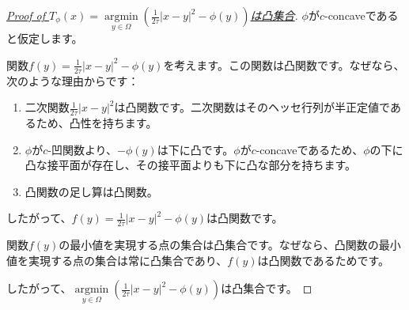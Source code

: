 \documentclass{jsarticle}
\theoremstyle{definition}
\begin{document}
\begin{proof}[\hyperlink{convex set of T}{Proof of \hypertarget{convex set}{$T_\phi(x) = \underset{y \in \Omega} {\operatorname{argmin}}\left( \frac{1}{2 \tau} |x - y|^2 - \phi(y) \right)$は凸集合}}]
    \quad\par
    $\phi$が$c$-concaveであると仮定します。
    
    関数$f(y) = \frac{1}{2 \tau} |x - y|^2 - \phi(y)$を考えます。この関数は凸関数です。なぜなら、次のような理由からです：
    
    \begin{enumerate}
        \item 二次関数$\frac{1}{2 \tau} |x - y|^2$は凸関数です。二次関数はそのヘッセ行列が半正定値であるため、凸性を持ちます。
        \item $\phi$が$c$-凹関数より、$-\phi(y)$は下に凸です。$\phi$が$c$-concaveであるため、$\phi$の下に凸な接平面が存在し、その接平面よりも下に凸な部分を持ちます。
        \item 凸関数の足し算は凸関数。
    \end{enumerate}
    
    したがって、$f(y) = \frac{1}{2 \tau} |x - y|^2 - \phi(y)$は凸関数です。
    
    関数$f(y)$の最小値を実現する点の集合は凸集合です。なぜなら、凸関数の最小値を実現する点の集合は常に凸集合であり、$f(y)$は凸関数であるためです。
    
    したがって、$\underset{y \in \Omega} {\operatorname{argmin}}\left( \frac{1}{2 \tau} |x - y|^2 - \phi(y) \right)$は凸集合です。
\end{proof}
    
\end{document}
